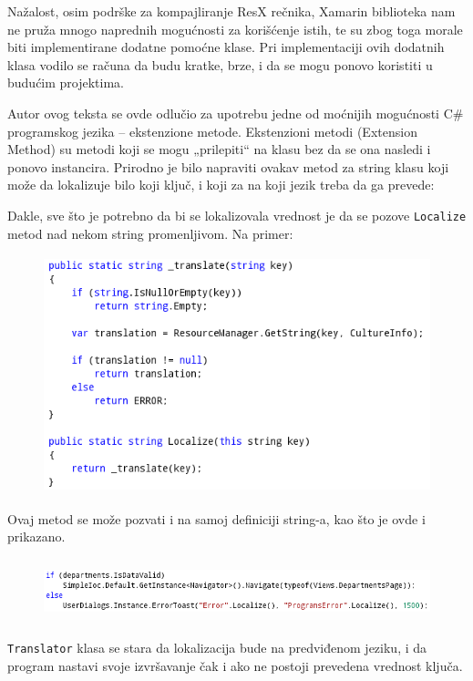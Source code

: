 \documentclass[a4paper]{article}
\begin{document}
Nažalost, osim podrške za kompajliranje ResX rečnika, Xamarin biblioteka
nam ne pruža mnogo naprednih mogućnosti za korišćenje istih, te su zbog
toga morale biti implementirane dodatne pomoćne klase. Pri
implementaciji ovih dodatnih klasa vodilo se računa da budu kratke,
brze, i da se mogu ponovo koristiti u budućim projektima.

Autor ovog teksta se ovde odlučio za upotrebu jedne od moćnijih
mogućnosti C\# programskog jezika – ekstenzione metode. Ekstenzioni
metodi (Extension Method) su metodi koji se mogu „prilepiti“ na klasu
bez da se ona nasledi i ponovo instancira. Prirodno je bilo napraviti
ovakav metod za string klasu koji može da lokalizuje bilo koji ključ, i
koji za na koji jezik treba da ga prevede:

Dakle, sve što je potrebno da bi se lokalizovala vrednost je da se
pozove \texttt{\textcolor[rgb]{0.0,0.4,0.8}{Localize}} metod nad nekom
string promenljivom. Na primer:

\begin{figure}
\centering
\includegraphics[width=115.85mm,height=69mm]{msc-img52.png}
\end{figure}
Ovaj metod se može pozvati i na samoj definiciji string-a, kao što je
ovde i prikazano. 

\begin{figure}
\centering
\includegraphics[width=170mm,height=18.43mm]{msc-img53.png}
\end{figure}
\texttt{\textcolor[rgb]{0.0,0.4,0.8}{Translator}} klasa se stara da
lokalizacija bude na predviđenom jeziku, i da program nastavi svoje
izvršavanje čak i ako ne postoji prevedena vrednost ključa.
\end{document}
